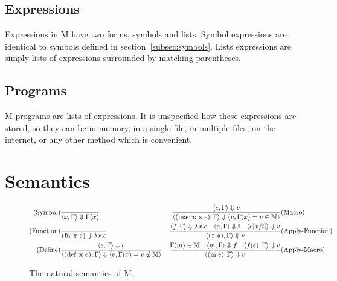 \documentclass{article}
\begin{document}
\begin{multicols}{2}
        \subsection{Expressions}\label{subsec:expressions}

        \begin{minipage}{\columnwidth}
            Expressions in M have two forms, symbols and lists.
            Symbol expressions are identical to symbols defined in section~\ref{subsec:symbols}.
            Lists expressions are simply lists of expressions surrounded by matching parentheses.
        \end{minipage}

        \subsection{Programs}\label{subsec:programs}

        \begin{minipage}{\columnwidth}
            M programs are lists of expressions.
            It is unspecified how these expressions are stored, so they can be in memory, in a single file, in multiple files, on the internet, or any other method which is convenient.
        \end{minipage}
    \end{multicols}
    \newpage

    \section{Semantics}\label{sec:semantics}

    \begin{figure}[h]
        \centering
        \begin{align*}
            \text{(Symbol)}&\dfrac{}{\langle x,\Gamma\rangle\Downarrow\Gamma(x)}
            &\dfrac{\langle e,\Gamma\rangle\Downarrow v}{\langle\lstinline$(macro x e)$,\Gamma\rangle\Downarrow\langle v,\Gamma(x) = v\in\mathbb{M}\rangle}&\text{(Macro)}\\
            \text{(Function)}&\dfrac{}{\lstinline$(fn x e)$\Downarrow\lambda x.e}
            &\dfrac{\langle f,\Gamma\rangle\Downarrow\lambda x.e\quad\langle a,\Gamma\rangle\Downarrow i\quad\langle e[x/i]\rangle\Downarrow v}{\langle\lstinline$(f a)$,\Gamma\rangle\Downarrow v}&\text{(Apply-Function)}\\
            \text{(Define)}&\dfrac{\langle e,\Gamma\rangle\Downarrow v}{\langle\lstinline$(def x e)$,\Gamma\rangle\Downarrow\langle v,\Gamma(x) = v\notin\mathbb{M}\rangle}
            &\dfrac{\Gamma(m)\in\mathbb{M}\quad\langle m,\Gamma\rangle\Downarrow f\quad\langle f(e),\Gamma\rangle\Downarrow v}{\langle\lstinline$(m e)$,\Gamma\rangle\Downarrow v}&\text{(Apply-Macro)}
        \end{align*}
        \caption{The natural semantics of M.}
    \end{figure}
\end{document}

